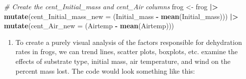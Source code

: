 \documentclass[
  10t,
]{article}
\newenvironment{Shaded}{\begin{snugshade}}{\end{snugshade}}
\newcommand{\AttributeTok}[1]{\textcolor[rgb]{0.13,0.29,0.53}{#1}}
\newcommand{\CommentTok}[1]{\textcolor[rgb]{0.56,0.35,0.01}{\textit{#1}}}
\newcommand{\FunctionTok}[1]{\textcolor[rgb]{0.13,0.29,0.53}{\textbf{#1}}}
\newcommand{\NormalTok}[1]{#1}
\newcommand{\OtherTok}[1]{\textcolor[rgb]{0.56,0.35,0.01}{#1}}
\newcommand{\SpecialCharTok}[1]{\textcolor[rgb]{0.81,0.36,0.00}{\textbf{#1}}}
\providecommand{\tightlist}{%
  \setlength{\itemsep}{0pt}\setlength{\parskip}{0pt}}\usepackage{longtable,booktabs,array}
\begin{document}
\begin{Shaded}
\begin{Highlighting}[]
\CommentTok{\# Create the cent\_Initial\_mass and cent\_Air columns}
\NormalTok{frog }\OtherTok{\textless{}{-}}\NormalTok{ frog }\SpecialCharTok{|\textgreater{}}
  \FunctionTok{mutate}\NormalTok{(}\AttributeTok{cent\_Initial\_mass\_new =}\NormalTok{ (Initial\_mass }\SpecialCharTok{{-}} \FunctionTok{mean}\NormalTok{(Initial\_mass))) }\SpecialCharTok{|\textgreater{}}
  \FunctionTok{mutate}\NormalTok{(}\AttributeTok{cent\_Air\_new =}\NormalTok{ (Airtemp }\SpecialCharTok{{-}} \FunctionTok{mean}\NormalTok{(Airtemp)))}
\end{Highlighting}
\end{Shaded}

\begin{enumerate}
\def\labelenumi{\alph{enumi}.}
\setcounter{enumi}{3}
\tightlist
\item
  To create a purely visual analysis of the factors responsible for
  dehydration rates in frogs, we can trend lines, scatter plots,
  boxplots, etc. examine the effects of substrate type, initial mass,
  air temperature, and wind on the percent mass lost. The code would
  look something like this:
\end{enumerate}
\end{document}
